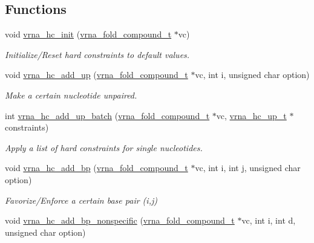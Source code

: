 \subsection*{Functions}
\begin{DoxyCompactItemize}
\item 
void \mbox{\hyperlink{group__hard__constraints_ga36ff456c43bf920629cee5a236e4f0ff}{vrna\+\_\+hc\+\_\+init}} (\mbox{\hyperlink{group__fold__compound_ga1b0cef17fd40466cef5968eaeeff6166}{vrna\+\_\+fold\+\_\+compound\+\_\+t}} $\ast$vc)
\begin{DoxyCompactList}\small\item\em Initialize/\+Reset hard constraints to default values. \end{DoxyCompactList}\item 
void \mbox{\hyperlink{group__hard__constraints_ga447d88e06ad97bb225cd83310ace8345}{vrna\+\_\+hc\+\_\+add\+\_\+up}} (\mbox{\hyperlink{group__fold__compound_ga1b0cef17fd40466cef5968eaeeff6166}{vrna\+\_\+fold\+\_\+compound\+\_\+t}} $\ast$vc, int i, unsigned char option)
\begin{DoxyCompactList}\small\item\em Make a certain nucleotide unpaired. \end{DoxyCompactList}\item 
int \mbox{\hyperlink{group__hard__constraints_ga5070f296c8af2baea10951525519464f}{vrna\+\_\+hc\+\_\+add\+\_\+up\+\_\+batch}} (\mbox{\hyperlink{group__fold__compound_ga1b0cef17fd40466cef5968eaeeff6166}{vrna\+\_\+fold\+\_\+compound\+\_\+t}} $\ast$vc, \mbox{\hyperlink{group__hard__constraints_ga8cd53427a942a81c87ec526bbff32ef9}{vrna\+\_\+hc\+\_\+up\+\_\+t}} $\ast$constraints)
\begin{DoxyCompactList}\small\item\em Apply a list of hard constraints for single nucleotides. \end{DoxyCompactList}\item 
void \mbox{\hyperlink{group__hard__constraints_ga7cba95ebe2ceb5ec9a5768f2232854fd}{vrna\+\_\+hc\+\_\+add\+\_\+bp}} (\mbox{\hyperlink{group__fold__compound_ga1b0cef17fd40466cef5968eaeeff6166}{vrna\+\_\+fold\+\_\+compound\+\_\+t}} $\ast$vc, int i, int j, unsigned char option)
\begin{DoxyCompactList}\small\item\em Favorize/\+Enforce a certain base pair (i,j) \end{DoxyCompactList}\item 
void \mbox{\hyperlink{group__hard__constraints_gaed50398ade2d4852c9e82592fe76046c}{vrna\+\_\+hc\+\_\+add\+\_\+bp\+\_\+nonspecific}} (\mbox{\hyperlink{group__fold__compound_ga1b0cef17fd40466cef5968eaeeff6166}{vrna\+\_\+fold\+\_\+compound\+\_\+t}} $\ast$vc, int i, int d, unsigned char option)

\end{DoxyCompactItemize}
